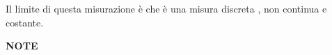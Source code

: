 \documentclass[a4paper, 15pt]{article}
\begin{document}
\begin{adjustwidth}{2in}{}
\begin{enumerate}
			Il limite di questa misurazione è che è una misura discreta , non continua e costante. 
		\end{enumerate}
		 
\newpage

{\LARGE \textbf{NOTE}}
	
\end{adjustwidth}
\end{document}
